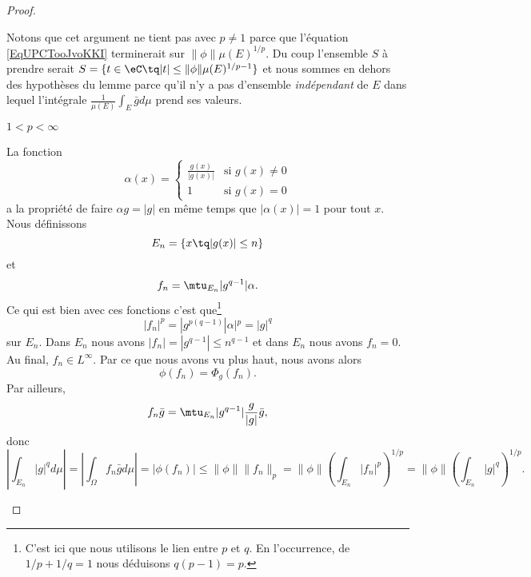 \begin{proof}
\begin{subproof}
            Notons que cet argument ne tient pas avec \( p\neq 1\) parce que l'équation \eqref{EqUPCTooJvoKKI} terminerait sur \( \| \phi \|\mu(E)^{1/p}\). Du coup l'ensemble \( S\) à prendre serait \( S=\{ t\in \eC\tq | t |\leq \| \phi \|\mu(E)^{1/p-1} \}\) et nous sommes en dehors des hypothèses du lemme parce qu'il n'y a pas d'ensemble \emph{indépendant} de \( E\) dans lequel l'intégrale \( \frac{1}{ \mu(E) }\int_{E}\bar gd\mu\) prend ses valeurs.

        \item[\( 1<p<\infty\)]

            La fonction
            \begin{equation}
                \alpha(x)=\begin{cases}
                    \frac{ g(x) }{ | g(x) | }    &   \text{si } g(x)\neq 0\\
                    1    &    \text{si } g(x)=0
                \end{cases}
            \end{equation}
            a la propriété de faire \( \alpha g=| g |\) en même temps que \( | \alpha(x) |=1\) pour tout \( x\). Nous définissons
            \begin{equation}
                E_n=\{ x\tq | g(x) |\leq n \}
            \end{equation}
            et
            \begin{equation}
                f_n=\mtu_{E_n}| g^{q-1} |\alpha.
            \end{equation}
            Ce qui est bien avec ces fonctions c'est que\footnote{C'est ici que nous utilisons le lien entre $p$ et $q$. En l'occurrence, de $1/p+1/q=1$ nous déduisons $q(p-1)=p$.}
            \begin{equation}
                | f_n |^p=| g^{p(q-1)} | \alpha |^p=| g |^q
            \end{equation}
            sur \( E_n\). Dans \( E_n\) nous avons \( | f_n |=| g^{q-1} |\leq n^{q-1}\) et dans \( E_n\) nous avons \( f_n=0\). Au final, \( f_n\in L^{\infty}\). Par ce que nous avons vu plus haut, nous avons alors
            \begin{equation}
                \phi(f_n)=\Phi_g(f_n).
            \end{equation}
            Par ailleurs,
            \begin{equation}
                f_n\bar g=\mtu_{E_n}| g^{q-1} |\frac{ g }{ | g | }\bar g,
            \end{equation}
            donc
            \begin{equation}
                \left|\int_{E_n}| g |^qd\mu\right|=|\int_{\Omega}f_n\bar gd\mu|=|\phi(f_n)|\leq \| \phi \|\| f_n \|_p=\| \phi \|\left( \int_{E_n}| f_n |^p \right)^{1/p}=\| \phi \|\left( \int_{E_n}| g |^q \right)^{1/p}.
            \end{equation}


\end{subproof}
\end{proof}
